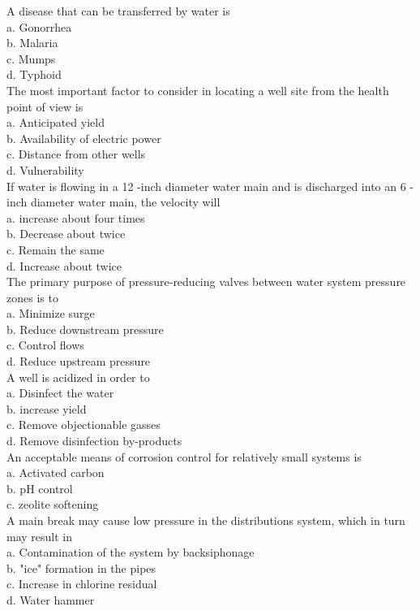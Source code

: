 A disease that can be transferred by water is\\
a. Gonorrhea\\
b. Malaria\\
c. Mumps\\
d. Typhoid\\

The most important factor to consider in locating a well site from the health point of view is\\
a. Anticipated yield\\
b. Availability of electric power\\
c. Distance from other wells\\
d. Vulnerability\\

If water is flowing in a 12 -inch diameter water main and is discharged into an 6 -inch diameter water main, the velocity will\\
a. increase about four times\\
b. Decrease about twice\\
c. Remain the same\\
d. Increase about twice\\

The primary purpose of pressure-reducing valves between water system pressure zones is to\\
a. Minimize surge\\
b. Reduce downstream pressure\\
c. Control flows\\
d. Reduce upstream pressure\\

  A well is acidized in order to\\
a. Disinfect the water\\
b. increase yield\\
c. Remove objectionable gasses\\
d. Remove disinfection by-products\\

 An acceptable means of corrosion control for relatively small systems is\\
a. Activated carbon \\
b. $\mathrm{pH}$ control\\
c. zeolite softening\\

A main break may cause low pressure in the distributions system, which in turn may result in\\
a. Contamination of the system by backsiphonage\\
b. "ice" formation in the pipes\\
c. Increase in chlorine residual\\
d. Water hammer\\

